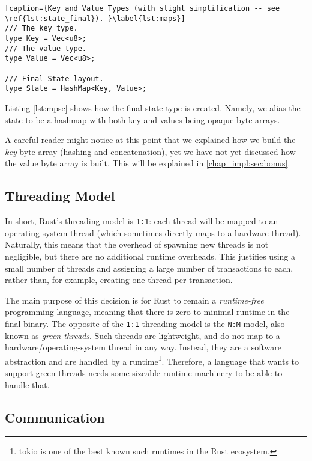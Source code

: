 \begin{lstlisting}[caption={Key and Value Types (with slight simplification -- see \ref{lst:state_final}). }\label{lst:maps}]
/// The key type.
type Key = Vec<u8>;
/// The value type.
type Value = Vec<u8>;

/// Final State layout.
type State = HashMap<Key, Value>;
\end{lstlisting}

Listing \ref{lst:mpsc} shows how the final state type is created. Namely, we alias the state to be a
hashmap with both key and values being opaque byte arrays.

\begin{remark}
	A careful reader might notice at this point that we explained how we build the \textit{key} byte
	array (hashing and concatenation), yet we have not yet discussed how the value byte array is
	built. This will be explained in \ref{chap_impl:sec:bonus}.
\end{remark}

\subsection{Threading Model}

In short, Rust's threading model is \texttt{1:1}: each thread will be mapped to an operating system
thread (which sometimes directly maps to a hardware thread). Naturally, this means that the overhead
of spawning new threads is not negligible, but there are no additional runtime overheads. This
justifies using a small number of threads and assigning a large number of transactions to each,
rather than, for example, creating one thread per transaction.

The main purpose of this decision is for Rust to remain a \textit{runtime-free} programming
language\cite{RustJourneyAsync}, meaning that there is zero-to-minimal runtime in the final binary.
The opposite of the \texttt{1:1} threading model is the \texttt{N:M} model, also known as
\textit{green threads}. Such threads are lightweight, and do not map to a hardware/operating-system
thread in any way. Instead, they are a software abstraction and are handled by a
runtime\footnote{tokio is one of the best known such runtimes in the Rust
ecosystem\cite{TokioRust}.}. Therefore, a language that wants to support green threads needs some
sizeable runtime machinery to be able to handle that.

\subsection{Communication}

